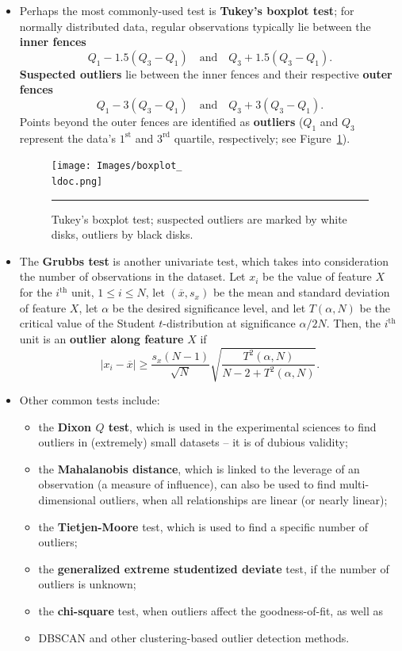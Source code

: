 \begin{itemize}[noitemsep]
\item Perhaps the most commonly-used test is \textbf{Tukey's boxplot test}; for normally distributed data, regular observations typically lie between the \textbf{inner fences} $$Q_1-1.5(Q_3-Q_1) \quad\mbox{and}\quad Q_3+1.5(Q_3-Q_1).$$ \textbf{Suspected outliers} lie between the inner fences and their respective \textbf{outer fences} 
$$Q_1-3(Q_3-Q_1) \quad\mbox{and}\quad Q_3+3(Q_3-Q_1).$$
Points beyond the outer fences are identified as \textbf{outliers} ($Q_1$ and $Q_3$ represent the data's   $1^{\textrm{st}}$ and $3^{\textrm{rd}}$ quartile, respectively; see Figure~\ref{fig:boxplot}).
\begin{figure}[t]
\centering
\texttt{[image: Images/boxplot\_\\ldoc.png]}
\caption[\small Tukey's boxplot test for outliers]{\small Tukey's boxplot test; suspected outliers are marked by white disks, outliers by black disks.}
\hrule\label{fig:boxplot}
\end{figure}
\afterpage{\FloatBarrier}
\item The \textbf{Grubbs test} is another univariate test, which takes into consideration the number of observations in the dataset. Let $x_i$ be the value of feature $X$ for the $i^{\textrm{th}}$ unit, $1\leq i\leq N$, let $(\overline{x},s_x)$ be the mean and standard deviation of feature $X$, let $\alpha$ be the desired significance level, and let  $T(\alpha,N)$ be the critical value of the Student $t$-distribution at significance $\alpha/2N$. Then, the $i^{\textrm{th}}$ unit is an \textbf{outlier along feature} $X$ if $$|x_i-\overline{x}| \geq \frac{s_x(N-1)}{\sqrt{N}}\sqrt{\frac{T^2(\alpha,N)}{N-2+T^2(\alpha,N)}}.$$
\item Other common tests include:
\begin{itemize}[noitemsep]
\item the \textbf{Dixon $Q$ test}, which is used in the experimental sciences to find outliers in (extremely) small datasets -- it is of dubious validity;
\item the \textbf{Mahalanobis distance}, which is linked to the leverage of an observation (a measure of influence), can also be used to find multi-dimen\-sio\-nal outliers, when all relationships are linear (or nearly linear);
\item the \textbf{Tietjen-Moore} test, which is used to find a specific number of outliers;
\item the \textbf{generalized extreme studentized deviate} test, if the number of outliers is unknown; 
\item the \textbf{chi-square} test, when outliers affect the goodness-of-fit, as well as 
\item DBSCAN and other clustering-based outlier detection methods.
\end{itemize}
\end{itemize}
